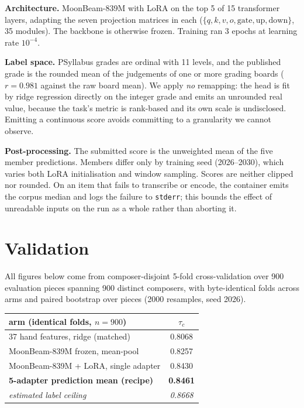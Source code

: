 \documentclass{article}
\begin{document}
\textbf{Architecture.} MoonBeam-839M with LoRA on the top 5 of 15 transformer
layers, adapting the seven projection matrices in each
($\{q,k,v,o,\mathrm{gate},\mathrm{up},\mathrm{down}\}$, 35 modules). The
backbone is otherwise frozen. Training ran 3 epochs at learning rate
$10^{-4}$.

\textbf{Label space.} PSyllabus grades are ordinal with 11 levels, and the
published grade is the rounded mean of the judgements of one or more grading
boards ($r = 0.981$ against the raw board mean). We apply \emph{no} remapping:
the head is fit by ridge regression directly on the integer grade and emits an
unrounded real value, because the task's metric is rank-based and its own scale
is undisclosed. Emitting a continuous score avoids committing to a granularity
we cannot observe.

\textbf{Post-processing.} The submitted score is the unweighted mean of the
five member predictions. Members differ only by training seed (2026--2030),
which varies both LoRA initialisation and window sampling. Scores are neither
clipped nor rounded. On an item that fails to transcribe or encode, the
container emits the corpus median and logs the failure to \texttt{stderr}; this
bounds the effect of unreadable inputs on the run as a whole rather than
aborting it.

\section{Validation}\label{sec:validation}

All figures below come from composer-disjoint 5-fold cross-validation over 900
evaluation pieces spanning 900 distinct composers, with byte-identical folds
across arms and paired bootstrap over pieces (2000 resamples, seed 2026).

\begin{table}[h]
\centering
\begin{tabular}{lc}
\toprule
arm (identical folds, $n=900$) & $\tau_c$ \\
\midrule
37 hand features, ridge (matched) & 0.8068 \\
MoonBeam-839M frozen, mean-pool & 0.8257 \\
MoonBeam-839M + LoRA, single adapter & 0.8430 \\
\textbf{5-adapter prediction mean (recipe)} & \textbf{0.8461} \\
\midrule
\emph{estimated label ceiling} & \emph{0.8668} \\
\bottomrule
\end{tabular}
\end{table}
\end{document}
